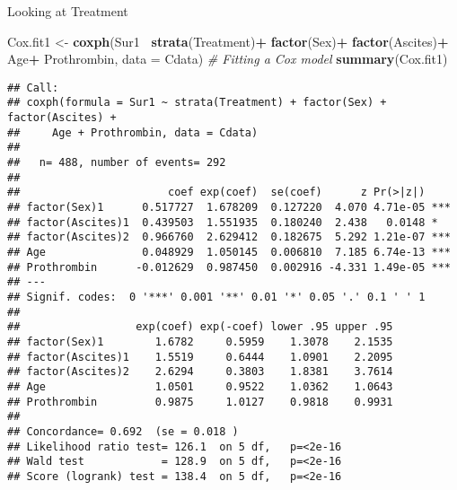 \documentclass[
]{article}
\newenvironment{Shaded}{\begin{snugshade}}{\end{snugshade}}
\newcommand{\CommentTok}[1]{\textcolor[rgb]{0.56,0.35,0.01}{\textit{#1}}}
\newcommand{\DataTypeTok}[1]{\textcolor[rgb]{0.13,0.29,0.53}{#1}}
\newcommand{\KeywordTok}[1]{\textcolor[rgb]{0.13,0.29,0.53}{\textbf{#1}}}
\newcommand{\NormalTok}[1]{#1}
\newcommand{\OperatorTok}[1]{\textcolor[rgb]{0.81,0.36,0.00}{\textbf{#1}}}
\newcommand{\StringTok}[1]{\textcolor[rgb]{0.31,0.60,0.02}{#1}}
\begin{document}
\begin{Shaded}
\end{Shaded}

Looking at Treatment

\begin{Shaded}
\begin{Highlighting}[]
\NormalTok{Cox.fit1 <-}\StringTok{ }\KeywordTok{coxph}\NormalTok{(Sur1}\OperatorTok{~}\StringTok{ }\KeywordTok{strata}\NormalTok{(Treatment)}\OperatorTok{+}\StringTok{ }\KeywordTok{factor}\NormalTok{(Sex)}\OperatorTok{+}\StringTok{ }\KeywordTok{factor}\NormalTok{(Ascites)}\OperatorTok{+}\StringTok{ }\NormalTok{Age}\OperatorTok{+}\StringTok{ }\NormalTok{Prothrombin, }\DataTypeTok{data =}\NormalTok{ Cdata) }\CommentTok{# Fitting a Cox model}
\KeywordTok{summary}\NormalTok{(Cox.fit1)}
\end{Highlighting}
\end{Shaded}

\begin{verbatim}
## Call:
## coxph(formula = Sur1 ~ strata(Treatment) + factor(Sex) + factor(Ascites) + 
##     Age + Prothrombin, data = Cdata)
## 
##   n= 488, number of events= 292 
## 
##                       coef exp(coef)  se(coef)      z Pr(>|z|)    
## factor(Sex)1      0.517727  1.678209  0.127220  4.070 4.71e-05 ***
## factor(Ascites)1  0.439503  1.551935  0.180240  2.438   0.0148 *  
## factor(Ascites)2  0.966760  2.629412  0.182675  5.292 1.21e-07 ***
## Age               0.048929  1.050145  0.006810  7.185 6.74e-13 ***
## Prothrombin      -0.012629  0.987450  0.002916 -4.331 1.49e-05 ***
## ---
## Signif. codes:  0 '***' 0.001 '**' 0.01 '*' 0.05 '.' 0.1 ' ' 1
## 
##                  exp(coef) exp(-coef) lower .95 upper .95
## factor(Sex)1        1.6782     0.5959    1.3078    2.1535
## factor(Ascites)1    1.5519     0.6444    1.0901    2.2095
## factor(Ascites)2    2.6294     0.3803    1.8381    3.7614
## Age                 1.0501     0.9522    1.0362    1.0643
## Prothrombin         0.9875     1.0127    0.9818    0.9931
## 
## Concordance= 0.692  (se = 0.018 )
## Likelihood ratio test= 126.1  on 5 df,   p=<2e-16
## Wald test            = 128.9  on 5 df,   p=<2e-16
## Score (logrank) test = 138.4  on 5 df,   p=<2e-16
\end{verbatim}
\end{document}
